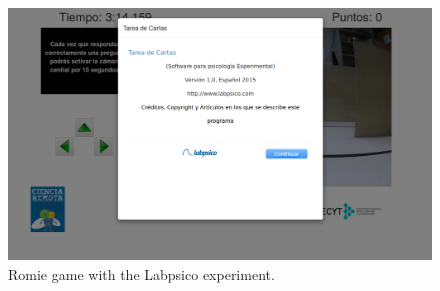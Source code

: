 \begin{figure}[ht]
	\centering
	\includegraphics[height=0.35\textheight]{fig/manuals/trivial/labpsico/labpsico-romie}
	\caption{Romie game with the Labpsico experiment.}
	\label{fig:labpsico_romie}
\end{figure}
